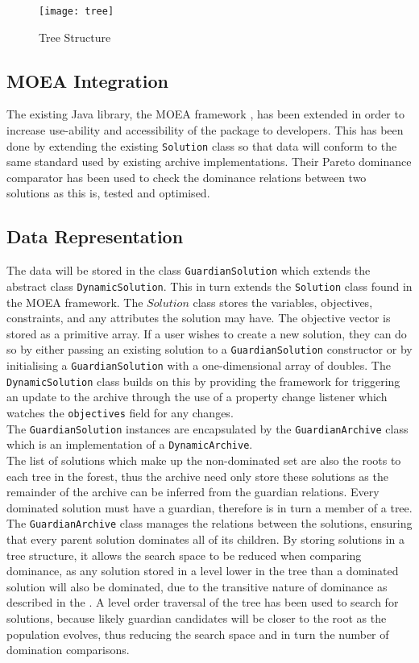\documentclass{ecmm427_assignment}
\begin{document}
\begin{figure}[h]
    \centering
    \texttt{[image: tree]}
    \caption{Tree Structure}
    \label{fig:tree}
\end{figure}

\subsection{MOEA Integration}
The existing Java library, the MOEA framework \cite{}, has been extended in order to increase use-ability and accessibility of the package to developers. This has been done by extending the existing \texttt{Solution} class so that data will conform to the same standard used by existing archive implementations. Their Pareto dominance comparator has been used to check the dominance relations between two solutions as this is, tested and optimised.

\subsection{Data Representation}
The data will be stored in the class \texttt{GuardianSolution} which extends the abstract class \texttt{DynamicSolution}. This in turn extends the \texttt{Solution} class found in the MOEA framework. The $Solution$ class stores the variables, objectives, constraints, and any attributes the solution may have. The objective vector is stored as a primitive array. If a user wishes to create a new solution, they can  do so by either passing an existing solution to a \texttt{GuardianSolution} constructor or by initialising a \texttt{GuardianSolution} with a one-dimensional array of doubles. The \texttt{DynamicSolution} class builds on this by providing the framework for triggering an update to the archive through the use of a property change listener which watches the \texttt{objectives} field for any changes.
\\The \texttt{GuardianSolution} instances are encapsulated by the \texttt{GuardianArchive} class which is an implementation of a \texttt{DynamicArchive}. 
\\The list of solutions which make up the non-dominated set are also the roots to each tree in the forest, thus the archive need only store these solutions as the remainder of the archive can be inferred from the guardian relations. Every dominated solution must have a guardian, therefore is in turn a member of a tree.
\\The \texttt{GuardianArchive} class manages the relations between the solutions, ensuring that every parent solution dominates all of its children. By storing solutions in a tree structure, it allows the search space to be reduced when comparing dominance, as any solution stored in a level lower in the tree than a dominated solution will also be dominated, due to the transitive nature of dominance as described in the . A level order traversal of the tree has been used to search for solutions, because likely guardian candidates will be closer to the root as the population evolves, thus reducing the search space and in turn the number of domination comparisons.
\end{document}
